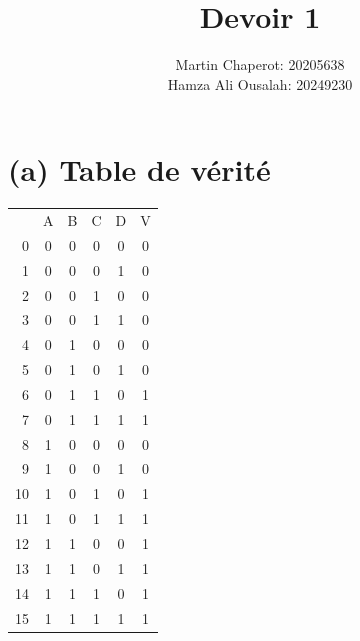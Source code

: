 \documentclass{article}
\title{Devoir 1}
\author{Martin Chaperot: 20205638\\ Hamza Ali Ousalah: 20249230}
\date{}
\begin{document}
\maketitle

\section*{(a) Table de vérité}
\begin{tabular}{r|c|c|c|c||c|}
    \cline{2-6}
       & A & B & C & D & V \\
    \cline{2-6}
    0  & 0 & 0 & 0 & 0 & 0 \\
    1  & 0 & 0 & 0 & 1 & 0 \\
    2  & 0 & 0 & 1 & 0 & 0 \\
    3  & 0 & 0 & 1 & 1 & 0 \\
    4  & 0 & 1 & 0 & 0 & 0 \\
    5  & 0 & 1 & 0 & 1 & 0 \\
    6  & 0 & 1 & 1 & 0 & 1 \\
    7  & 0 & 1 & 1 & 1 & 1 \\
    8  & 1 & 0 & 0 & 0 & 0 \\
    9  & 1 & 0 & 0 & 1 & 0 \\
    10 & 1 & 0 & 1 & 0 & 1 \\
    11 & 1 & 0 & 1 & 1 & 1 \\
    12 & 1 & 1 & 0 & 0 & 1 \\
    13 & 1 & 1 & 0 & 1 & 1 \\
    14 & 1 & 1 & 1 & 0 & 1 \\
    15 & 1 & 1 & 1 & 1 & 1 \\
    \cline{2-6}
\end{tabular}
\end{document}
